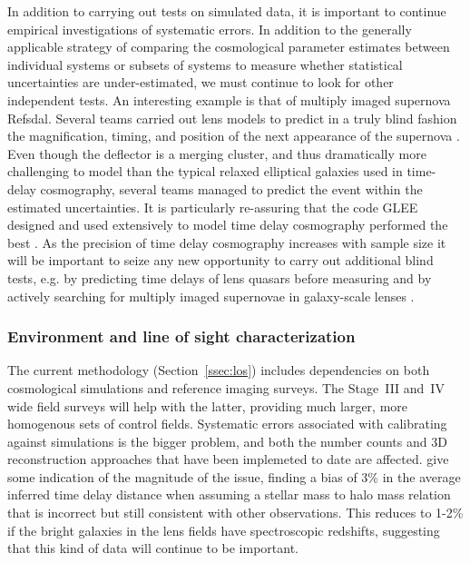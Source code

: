 In addition to carrying out tests on simulated data, it is important
to continue empirical investigations of systematic errors. In addition
to the generally applicable strategy of comparing the cosmological
parameter estimates between individual systems or subsets of systems
to measure whether statistical uncertainties are under-estimated, we
must continue to look for other independent tests. An interesting
example is that of multiply imaged supernova Refsdal. Several teams
carried out lens models to predict in a truly blind fashion the
magnification, timing, and position of the next appearance of the
supernova \citep{Kel++15,Ogu15,S+J15,Jau++16,Tre++16,Kaw++16,Gri++16}. Even
though the deflector is a merging cluster, and thus dramatically more
challenging to model than the typical relaxed elliptical galaxies used
in time-delay cosmography, several teams managed to predict the event
\citep{Tre++16,Kel++16}  within the estimated uncertainties.  
It is particularly re-assuring that the code GLEE designed and used
extensively to model time delay cosmography
\citep{Suy++10,Suy++13,Suy++14} performed the best
\citep{Gri++16}. As the precision of time delay cosmography increases
with sample size it will be important to seize any new opportunity to
carry out additional blind tests, e.g. by predicting time delays of
lens quasars before measuring and by actively searching for multiply
imaged supernovae in galaxy-scale lenses \citep{O+M10}.


\subsubsection{Environment and line of sight characterization}

The current methodology (Section~\ref{ssec:los}) includes dependencies
on both cosmological simulations and reference imaging surveys. The
Stage~III and~IV wide field surveys will help with the latter,
providing much larger, more homogenous sets of control fields.
Systematic errors associated with calibrating against simulations is
the bigger problem, and both the number counts and 3D reconstruction
approaches that have been implemeted to date are affected.
\citet{CollettEtal2013} give some indication of the magnitude of the
issue, finding a bias of 3\% in the average inferred time delay distance
when assuming a stellar mass to halo mass relation that is incorrect
but still consistent with other observations. This reduces to 1-2\%
if the bright galaxies in the lens fields have spectroscopic redshifts,
suggesting that this kind of data will continue to be important.

